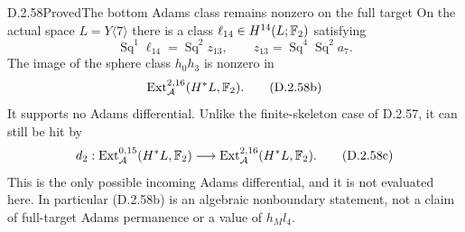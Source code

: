 \begin{claim}{D.2.58}{Proved}{The bottom Adams class remains nonzero on the full target}
On the actual space $L=Y\langle7\rangle$ there is a class
$\ell_{14}\in H^{14}(L;\mathbb F_2)$ satisfying
\[
 \operatorname{Sq}^1\ell_{14}
       =\operatorname{Sq}^2z_{13},\qquad
 z_{13}=\operatorname{Sq}^4\operatorname{Sq}^2a_7.
 \tag{D.2.58a}
\]
The image of the sphere class $h_0h_3$ is nonzero in
\[
 \operatorname{Ext}_{\mathcal A}^{2,16}
                 (H^*L,\mathbb F_2).
 \tag{D.2.58b}
\]
It supports no Adams differential.  Unlike the finite-skeleton
case of D.2.57, it can still be hit by
\[
 d_2:\operatorname{Ext}_{\mathcal A}^{0,15}(H^*L,\mathbb F_2)
       \longrightarrow
       \operatorname{Ext}_{\mathcal A}^{2,16}(H^*L,\mathbb F_2).
 \tag{D.2.58c}
\]
This is the only possible incoming Adams differential, and it is
not evaluated here.  In particular \textup{(D.2.58b)} is an
algebraic nonboundary statement, not a claim of full-target
Adams permanence or a value of $h_Ml_4$.
\end{claim}
